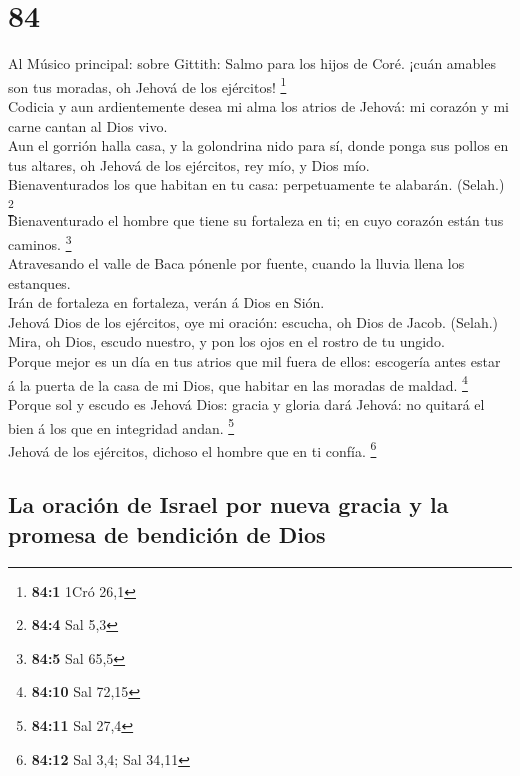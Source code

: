 \hypertarget{section-83}{%
\section{84}\label{section-83}}

 Al Músico principal: sobre Gittith: Salmo para los hijos
de Coré. ¡cuán amables son tus moradas, oh Jehová de los ejércitos!
\footnote{\textbf{84:1} 1Cró 26,1}\\
 Codicia y aun ardientemente desea mi alma los atrios de
Jehová: mi corazón y mi carne cantan al Dios vivo.\\
 Aun el gorrión halla casa, y la golondrina nido para sí,
donde ponga sus pollos en tus altares, oh Jehová de los ejércitos, rey
mío, y Dios mío.\\
 Bienaventurados los que habitan en tu casa: perpetuamente
te alabarán. (Selah.) \footnote{\textbf{84:4} Sal 5,3}\\
 Bienaventurado el hombre que tiene su fortaleza en ti; en
cuyo corazón están tus caminos. \footnote{\textbf{84:5} Sal 65,5}\\
 Atravesando el valle de Baca pónenle por fuente, cuando
la lluvia llena los estanques.\\
 Irán de fortaleza en fortaleza, verán á Dios en Sión.\\
 Jehová Dios de los ejércitos, oye mi oración: escucha, oh
Dios de Jacob. (Selah.)\\
 Mira, oh Dios, escudo nuestro, y pon los ojos en el
rostro de tu ungido.\\
 Porque mejor es un día en tus atrios que mil fuera de
ellos: escogería antes estar á la puerta de la casa de mi Dios, que
habitar en las moradas de maldad. \footnote{\textbf{84:10} Sal 72,15}\\
 Porque sol y escudo es Jehová Dios: gracia y gloria dará
Jehová: no quitará el bien á los que en integridad andan. \footnote{\textbf{84:11}
  Sal 27,4}\\
 Jehová de los ejércitos, dichoso el hombre que en ti
confía. \footnote{\textbf{84:12} Sal 3,4; Sal 34,11}

\hypertarget{la-oraciuxf3n-de-israel-por-nueva-gracia-y-la-promesa-de-bendiciuxf3n-de-dios}{%
\subsection{La oración de Israel por nueva gracia y la promesa de
bendición de
Dios}\label{la-oraciuxf3n-de-israel-por-nueva-gracia-y-la-promesa-de-bendiciuxf3n-de-dios}}


